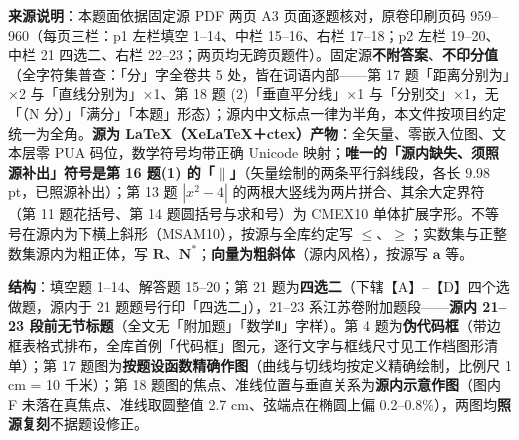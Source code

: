 


\begin{gktip}
\textbf{来源说明}：本题面依据固定源 PDF 两页 A3 页面逐题核对，原卷印刷页码 959–960（每页三栏：p1 左栏填空 1–14、中栏 15–16、右栏 17–18；p2 左栏 19–20、中栏 21 四选二、右栏 22–23；两页均无跨页题件）。固定源\textbf{不附答案}、\textbf{不印分值}（全字符集普查：「分」字全卷共 5 处，皆在词语内部——第 17 题「距离分别为」×2 与「直线分别为」×1、第 18 题 (2)「垂直平分线」×1 与「分别交」×1，无「（N 分）」「满分」「本题」形态）；源内中文标点一律为半角，本文件按项目约定统一为全角。\textbf{源为 LaTeX（XeLaTeX＋ctex）产物}：全矢量、零嵌入位图、文本层零 PUA 码位，数学符号均带正确 Unicode 映射；\textbf{唯一的「源内缺失、须照源补出」符号是第 16 题(1) 的「$\parallel$」}（矢量绘制的两条平行斜线段，各长 9.98 pt，已照源补出）；第 13 题 \(|x^{2}-4|\) 的两根大竖线为两片拼合、其余大定界符（第 11 题花括号、第 14 题圆括号与求和号）为 CMEX10 单体扩展字形。不等号在源内为下横上斜形（MSAM10），按源与全库约定写 \(\leqslant\)、\(\geqslant\)；实数集与正整数集源内为粗正体，写 \(\mathbf{R}\)、\(\mathbf{N}^{*}\)；\textbf{向量为粗斜体}（源内风格），按源写 \(\boldsymbol a\) 等。

\textbf{结构}：填空题 1–14、解答题 15–20；第 21 题为\textbf{四选二}（下辖【A】–【D】四个选做题，源内于 21 题题号行印「四选二」），21–23 系江苏卷附加题段——\textbf{源内 21–23 段前无节标题}（全文无「附加题」「数学Ⅱ」字样）。第 4 题为\textbf{伪代码框}（带边框表格式排布，全库首例「代码框」图元，逐行文字与框线尺寸见工作档图形清单）；第 17 题图为\textbf{按题设函数精确作图}（曲线与切线均按定义精确绘制，比例尺 1 cm = 10 千米）；第 18 题图的焦点、准线位置与垂直关系为\textbf{源内示意作图}（图内 F 未落在真焦点、准线取圆整值 2.7 cm、弦端点在椭圆上偏 0.2–0.8\%），两图均\textbf{照源复刻}不据题设修正。
\end{gktip}


